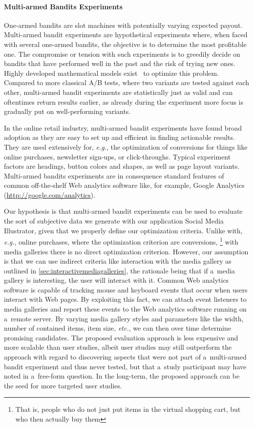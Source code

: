 \paragraph{Multi-armed Bandits Experiments}

One-armed bandits are slot machines
with potentially varying expected payout.
Multi-armed bandit experiments are hypothetical experiments
where, when faced with several one-armed bandits,
the objective is to determine the most profitable one.
The compromise or tension with such experiments is to
greedily decide on bandits that have performed well in the past
and the risk of trying new ones.
Highly developed mathematical models exist~\cite{scott2010bandits}
to optimize this problem.
Compared to more classical A/B tests, where two variants 
are tested against each other, multi-armed bandit experiments
are statistically just as valid and can oftentimes return results earlier, as already during the experiment
more focus is gradually put on well-performing variants.

In the online retail industry, multi-armed bandit experiments
have found broad adoption as they are easy to set up and efficient in finding actionable results.
They are used extensively for, \emph{e.g.}, the optimization 
of conversions for things like
online purchases, newsletter sign-ups, or click-throughs.
Typical experiment factors are headings, button colors and shapes,
as well as page layout variants.
Multi-armed bandits experiments are in consequence standard features
of common off-the-shelf Web analytics software like, for example,
Google Analytics (\url{http://google.com/analytics}).

Our hypothesis is that multi-armed bandit experiments can be used 
to evaluate the sort of subjective data we generate
with our application Social Media Illustrator, given that we 
properly define our optimization criteria.
Unlike with, \emph{e.g.}, online purchases,
where the optimization criterion are conversions,%
\footnote{That is, people who do not just put items in the virtual shopping cart,
but who then actually buy them}
with media galleries there is no direct optimization criterion.
However, our assumption is that we can use indirect criteria like
interaction with the media gallery
as outlined in \autoref{sec:interactivemediagalleries},
the rationale being that if
a~media gallery is interesting, the user will interact with it.
Common Web analytics software is capable of tracking mouse and
keyboard events that occur when users interact with Web pages.
By exploiting this fact, we can attach event listeners
to media galleries and report these events
to the Web analytics software running on a~remote server.
By varying media gallery styles and parameters like the width,
number of contained items, item size, \emph{etc.},
we can then over time determine promising candidates.
The proposed evaluation approach is less expensive
and more scalable than user studies,
albeit user studies may still outperform the approach
with regard to discovering aspects that were not part
of a~multi-armed bandit experiment and thus never tested,
but that a~study participant may have noted in a~free-form question.
In the long-term, the proposed approach
can be the seed for more targeted user studies.

